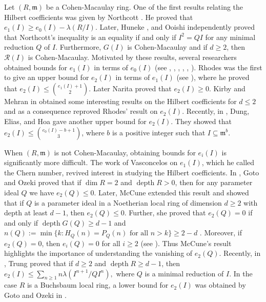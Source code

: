 \documentclass[reqno,a4paper,dvipsnames]{amsart}
\newcommand{\m}{\mathfrak{m} }
\newcommand{\depth}{\operatorname{depth}}
\theoremstyle{definition}
\begin{document}
Let   $(R, \m)$ be a Cohen-Macaulay ring. One of the first results relating the Hilbert coefficients was given  by Northcott \cite{northcott}. He proved that $e_{1}(I) \geq e_{0}(I)-\lambda(R/I).$
Later, Huneke \cite[Theorem 2.1]{huneke}, and Ooishi \cite{ooishi}  independently proved that Northcott's  inequality is an equality if and only if $I^2=QI$ for any minimal reduction $Q$ of $I$.  
Furthermore,  $G(I)$ is Cohen-Macaulay and if $d \geq 2$, then $\mathcal{R}(I)$ is Cohen-Macaulay. 
Motivated by these results, several researchers obtained bounds for $e_{1}(I)$ in terms of $e_{0}(I)$ 
(see \cite{elias 2}, \cite{elias 3}, \cite{krishna}, \cite{km}, \cite{rossi}, \cite{rv}). 
Rhodes was the first to give an upper bound for $e_2(I)$ in terms of $e_1(I)$ (see \cite[Proposition 6.1 (iv)]{rhodes}), where he proved that $e_{2}(I) \leq \binom{e_{1}(I)+1}{2}.$
Later  Narita \cite{narita}  proved that $e_{2}(I) \geq 0$. 
   Kirby and  Mehran in \cite{km} obtained some interesting results on the Hilbert coefficients  for $d \leq 2$ and as a consequence reproved Rhodes' result on $e_2(I)$. Recently, in \cite[Theorem 5.1]{dung},  Dung, Elias, and Hoa  gave another upper bound for $e_2(I)$. They showed that $e_{2}(I) \leq \binom{e_{0}(I)-b+1}{3}$, where $b$ is a positive integer such that $I \subseteq \m^{b}$.

 
When   $(R, \m)$  is  not Cohen-Macaulay,  obtaining  bounds for $e_i(I)$  is significantly more difficult. 
The work of Vasconcelos \cite{vasconcelos}  on $e_1(I)$,    which he called the Chern number, revived interest in studying the Hilbert coefficients. 
 In \cite[Theorem 3.2]{gotoozeki}, Goto and Ozeki proved that if $\dim R=2$ and 
 $\depth R>0$, then   for any parameter ideal $Q$ we have   $e_{2}(Q) \leq 0$. Later, McCune extended this result and showed that if $Q$ is a parameter ideal in a Noetherian local ring of dimension $d \geq 2$ with depth at least $d-1$,  then $e_2(Q) \leq0$. Further, she proved that $e_{2}(Q)=0$ if and only if $\depth G(Q) \geq d-1 $ and $n(Q):=\min \{k: H_Q(n) =P_Q(n) \text{ for all } n > k\} \geq 2-d$ \cite[Theorem 3.5 (ii)]{lori}. 
Moreover,  if  $e_2(Q)=0$, then $e_i(Q)=0$ for all $i \geq 2$ (see \cite[Theorem 3.5 (iii)]{lori}).
Thus McCune's result highlights the importance of understanding the vanishing of $e_2(Q)$.
  Recently, in   \cite[Theorem 3.1]{vdtrung}, Trung  proved that if  $d\geq 2$ and  $\depth R \geq d-1$,  then   $e_{2}(I) \leq \displaystyle \sum_{n \geq 1}n \lambda(I^{n+1}/QI^{n}),$ where $Q$ is a minimal reduction of $I.$   In the case  $R$ is a Buchsbaum local ring,  a lower bound for $e_{2}(I)$ was obtained by Goto and Ozeki  in \cite[Theorem 2.11]{sk}. 
 
\end{document}
